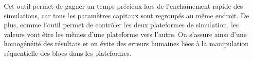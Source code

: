  Cet outil permet de gagner un temps précieux lors de l'enchaînement rapide des simulations, car tous les paramètres capitaux sont regroupés au même endroit. De plus, comme l'outil permet de contrôler les deux plateformes de simulation, les valeurs vont être les mêmes d'une plateforme vers l'autre. On s'assure ainsi d'une homogénéité des résultats et on évite des erreurs humaines liées à la manipulation séquentielle des blocs dans les plateformes. 
